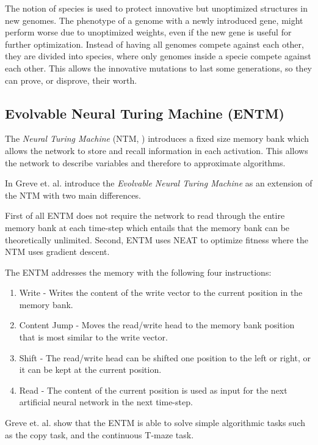 \newpar The notion of species is used to protect innovative but unoptimized structures in new genomes. The phenotype of a genome with a newly introduced gene, might perform worse due to unoptimized weights, even if the new gene is useful for further optimization. Instead of having all genomes compete against each other, they are divided into species, where only genomes inside a specie compete against each other. This allows the innovative mutations to last some generations, so they can prove, or disprove, their worth.

\subsection{Evolvable Neural Turing Machine (ENTM)}
The \textit{Neural Turing Machine} (NTM, \cite{graves2014neural}) introduces a fixed size memory bank which allows the network to store and recall information in each activation. This allows the network to describe variables and therefore to approximate algorithms.

\newpar In \cite{greve2016evolving} Greve et. al. introduce the \textit{Evolvable Neural Turing Machine} as an extension of the NTM with two main differences. 

First of all ENTM does not require the network to read through the entire memory bank at each time-step which entails that the memory bank can be theoretically unlimited. Second, ENTM uses NEAT to optimize fitness where the NTM uses gradient descent.

\newpar The ENTM addresses the memory with the following four instructions:

\begin{enumerate}
	\item Write - Writes the content of the write vector to the current position in the memory bank.
	\item Content Jump - Moves the read/write head to the memory bank position that is most similar to the write vector.
	\item Shift - The read/write head can be shifted one position to the left or right, or it can be kept at the current position.
	\item Read - The content of the current position is used as input for the next artificial neural network in the next time-step.
\end{enumerate}

\newpar Greve et. al. show that the ENTM is able to solve simple algorithmic tasks such as the copy task, and the continuous T-maze task.
